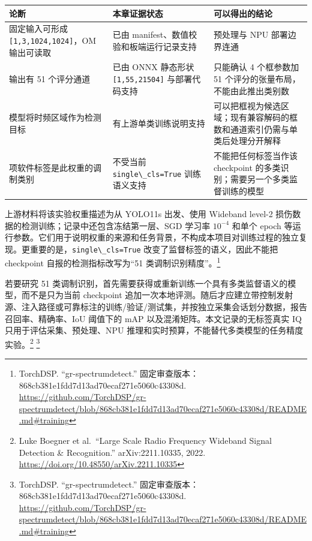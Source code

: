 \begin{longtable}[]{@{}
  >{\raggedright\arraybackslash}p{}
  >{\raggedright\arraybackslash}p{}
  >{\raggedright\arraybackslash}p{}@{}}
\toprule\noalign{}
\begin{minipage}[b]{\linewidth}\raggedright
论断
\end{minipage} & \begin{minipage}[b]{\linewidth}\raggedright
本章证据状态
\end{minipage} & \begin{minipage}[b]{\linewidth}\raggedright
可以得出的结论
\end{minipage} \\
\midrule\noalign{}
\endhead
\bottomrule\noalign{}
\endlastfoot
固定输入可形成 \passthrough{\lstinline![1,3,1024,1024]!}，OM 输出可读取
& 已由 manifest、数值校验和板端运行记录支持 & 预处理与 NPU
部署边界连通 \\
输出有 51 个评分通道 & 已由 ONNX 静态形状
\passthrough{\lstinline![1,55,21504]!} 与部署代码支持 & 只能确认 4
个框参数加 51 个评分的张量布局，不能由此推出类别数 \\
模型将时频区域作为检测目标 & 有上游单类训练说明支持 &
可以把框视为候选区域；现有兼容解码的框数和通道索引仍需与单类后处理分开解释 \\
51 项软件标签是此权重的调制类别 & 不受当前
\passthrough{\lstinline!single\_cls=True!} 训练语义支持 &
不能把任何标签当作该 checkpoint
的多类识别；需要另一个多类监督训练的模型 \\
\end{longtable}

上游材料将该实验权重描述为从 YOLO11s 出发、使用 Wideband level-2
损伤数据的检测训练；记录中还包含冻结第一层、SGD 学习率 \(10^{-4}\)
和单个 epoch
等运行参数。它们用于说明权重的来源和任务背景，不构成本项目对训练过程的独立复现。更重要的是，\passthrough{\lstinline!single\_cls=True!}
改变了监督标签的语义，因此不能把 checkpoint 自报的检测指标改写为``51
类调制识别精度''。\footnote{TorchDSP. ``gr-spectrumdetect.''
  固定审查版本：868cb381e1fdd7d13ad70ecaf271e5060c43308d.
  \url{https://github.com/TorchDSP/gr-spectrumdetect/blob/868cb381e1fdd7d13ad70ecaf271e5060c43308d/README.md\#training}}

若要研究 51
类调制识别，首先需要获得或重新训练一个具有多类监督语义的模型，而不是只为当前
checkpoint
追加一次本地评测。随后才应建立带控制发射源、注入路径或可靠标注的训练/验证/测试集，并按独立采集会话划分数据，报告召回率、精确率、IoU
阈值下的 mAP 以及混淆矩阵。本文记录的无标签真实 IQ
只用于评估采集、预处理、NPU
推理和实时预算，不能替代多类模型的任务精度实验。\footnote{Luke Boegner
  et al.~``Large Scale Radio Frequency Wideband Signal Detection \&
  Recognition.'' arXiv:2211.10335, 2022.
  \url{https://doi.org/10.48550/arXiv.2211.10335}} \footnote{TorchDSP.
  ``gr-spectrumdetect.''
  固定审查版本：868cb381e1fdd7d13ad70ecaf271e5060c43308d.
  \url{https://github.com/TorchDSP/gr-spectrumdetect/blob/868cb381e1fdd7d13ad70ecaf271e5060c43308d/README.md\#training}}

